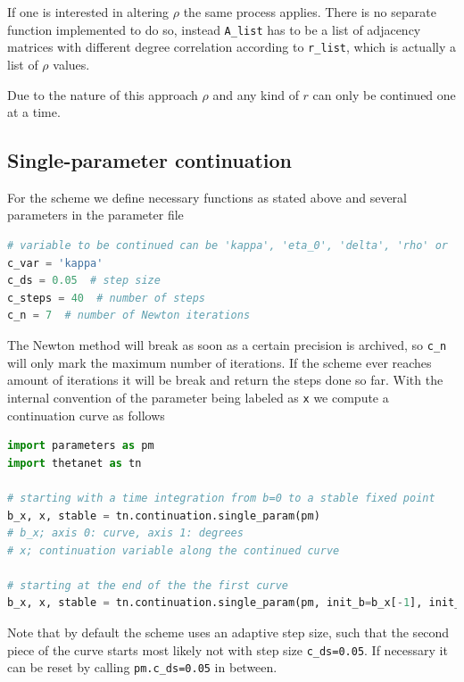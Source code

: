 \documentclass[bibliography=totoc, twoside]{article}
\numberwithin{equation}{section}
\begin{document}
If one is interested in altering $\rho$ the same process applies.
There is no separate function implemented to do so, instead \texttt{A\_list} has to be a list of adjacency matrices with different degree correlation according to \texttt{r\_list}, which is actually a list of $\rho$ values.

Due to the nature of this approach $\rho$ and any kind of $r$ can only be continued one at a time.


\subsection{Single-parameter continuation}
For the scheme we define necessary functions as stated above and several parameters in the parameter file
\begin{lstlisting}[language=python]
# variable to be continued can be 'kappa', 'eta_0', 'delta', 'rho' or 'r'
c_var = 'kappa'
c_ds = 0.05  # step size
c_steps = 40  # number of steps
c_n = 7  # number of Newton iterations
\end{lstlisting}
The Newton method will break as soon as a certain precision is archived, so \texttt{c\_n} will only mark the maximum number of iterations.
If the scheme ever reaches amount of iterations it will be break and return the steps done so far.
With the internal convention of the parameter being labeled as \texttt{x} we compute a continuation curve as follows
\begin{lstlisting}[language=python]
import parameters as pm
import thetanet as tn

# starting with a time integration from b=0 to a stable fixed point
b_x, x, stable = tn.continuation.single_param(pm)
# b_x; axis 0: curve, axis 1: degrees
# x; continuation variable along the continued curve

# starting at the end of the the first curve
b_x, x, stable = tn.continuation.single_param(pm, init_b=b_x[-1], init_x=x[-1], init_stability=stable[-1])
\end{lstlisting}
Note that by default the scheme uses an adaptive step size, such that the second piece of the curve starts most likely not with step size \texttt{c\_ds=0.05}.
If necessary it can be reset by calling \texttt{pm.c\_ds=0.05} in between.
\end{document}

